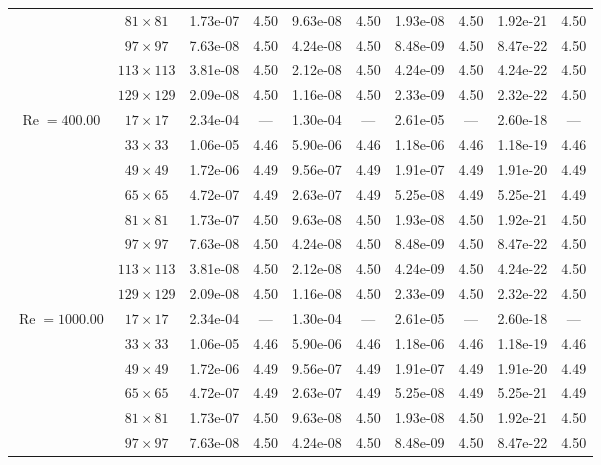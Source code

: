 \documentclass[preprint, 12pt]{elsarticle}
\begin{document}
{\begin{center}
\begin{table}[H]
{\begin{tabular*}{\textwidth}{@{\extracolsep\fill}cccccccccc@{}}
    & $81\times 81$ & 1.73e-07 & 4.50 & 9.63e-08 & 4.50 & 1.93e-08 & 4.50 & 1.92e-21 & 4.50 \\
    & $97\times 97$ & 7.63e-08 & 4.50 & 4.24e-08 & 4.50 & 8.48e-09 & 4.50 & 8.47e-22 & 4.50 \\
    & $113\times 113$ & 3.81e-08 & 4.50 & 2.12e-08 & 4.50 & 4.24e-09 & 4.50 & 4.24e-22 & 4.50 \\
    & $129\times 129$ & 2.09e-08 & 4.50 & 1.16e-08 & 4.50 & 2.33e-09 & 4.50 & 2.32e-22 & 4.50 \\
    \hline
    \multirow{7}{*}{$\operatorname{Re}=400.00$} & $17\times 17$ & 2.34e-04 & --- & 1.30e-04 & --- & 2.61e-05 & --- & 2.60e-18 & --- \\
    & $33\times 33$ & 1.06e-05 & 4.46 & 5.90e-06 & 4.46 & 1.18e-06 & 4.46 & 1.18e-19 & 4.46 \\
    & $49\times 49$ & 1.72e-06 & 4.49 & 9.56e-07 & 4.49 & 1.91e-07 & 4.49 & 1.91e-20 & 4.49 \\
    \multirow{3}{*}{$\operatorname{Wi}=5$} & $65\times 65$ & 4.72e-07 & 4.49 & 2.63e-07 & 4.49 & 5.25e-08 & 4.49 & 5.25e-21 & 4.49 \\
    & $81\times 81$ & 1.73e-07 & 4.50 & 9.63e-08 & 4.50 & 1.93e-08 & 4.50 & 1.92e-21 & 4.50 \\
    & $97\times 97$ & 7.63e-08 & 4.50 & 4.24e-08 & 4.50 & 8.48e-09 & 4.50 & 8.47e-22 & 4.50 \\
    & $113\times 113$ & 3.81e-08 & 4.50 & 2.12e-08 & 4.50 & 4.24e-09 & 4.50 & 4.24e-22 & 4.50 \\
    & $129\times 129$ & 2.09e-08 & 4.50 & 1.16e-08 & 4.50 & 2.33e-09 & 4.50 & 2.32e-22 & 4.50 \\
    \hline
    \multirow{7}{*}{$\operatorname{Re}=1000.00$} & $17\times 17$ & 2.34e-04 & --- & 1.30e-04 & --- & 2.61e-05 & --- & 2.60e-18 & --- \\
    & $33\times 33$ & 1.06e-05 & 4.46 & 5.90e-06 & 4.46 & 1.18e-06 & 4.46 & 1.18e-19 & 4.46 \\
    & $49\times 49$ & 1.72e-06 & 4.49 & 9.56e-07 & 4.49 & 1.91e-07 & 4.49 & 1.91e-20 & 4.49 \\
    \multirow{3}{*}{$\operatorname{Wi}=5$} & $65\times 65$ & 4.72e-07 & 4.49 & 2.63e-07 & 4.49 & 5.25e-08 & 4.49 & 5.25e-21 & 4.49 \\
    & $81\times 81$ & 1.73e-07 & 4.50 & 9.63e-08 & 4.50 & 1.93e-08 & 4.50 & 1.92e-21 & 4.50 \\
    & $97\times 97$ & 7.63e-08 & 4.50 & 4.24e-08 & 4.50 & 8.48e-09 & 4.50 & 8.47e-22 & 4.50 \\

\end{tabular*}}
\end{table}
\end{center}}
\end{document}
